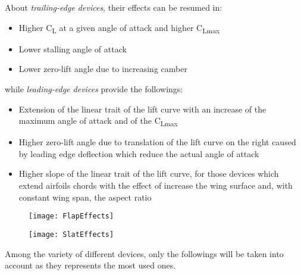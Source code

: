 \bigskip
\noindent
About \emph{trailing-edge devices}, their effects can be resumed in:
%
\begin{itemize}
\item Higher C\textsubscript{L} at a given angle of attack and higher C\textsubscript{Lmax}
\item Lower stalling angle of attack
\item Lower zero-lift angle due to increasing camber
\end{itemize}
%
\noindent
while \emph{leading-edge devices} provide the followings:
\begin{itemize}
\item Extension of the linear trait of the lift curve with an increase of the maximum angle of attack and of the C\textsubscript{Lmax}
\item Higher zero-lift angle due to translation of the lift curve on the right caused by leading edge deflection which reduce the actual angle of attack 
\item Higher slope of the linear trait of the lift curve, for those devices which extend airfoils chords with the effect of increase the wing surface and, with constant wing span, the aspect ratio
\end{itemize}
%
\begin{figure}
\centering
\begin{minipage}{.5\textwidth}
\centering
\texttt{[image: FlapEffects]}
\label{fig:FlapEffects}
\end{minipage}%
\begin{minipage}{.5\textwidth}
\centering
\texttt{[image: SlatEffects]}
\label{fig:SlatEffects}
\end{minipage}
\label{fig:FlapSlatEffects}
\end{figure}
%
\noindent
Among the variety of different devices, only the followings will be taken into account as they represents the most used ones.
%

